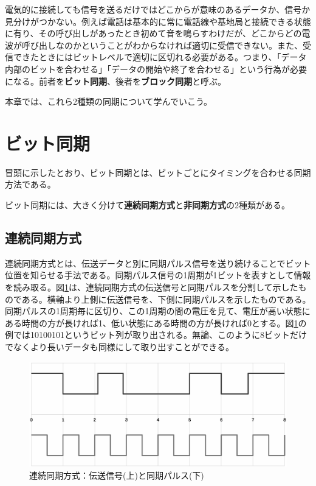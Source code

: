 電気的に接続しても信号を送るだけではどこからが意味のあるデータか、信号か見分けがつかない。例えば電話は基本的に常に電話線や基地局と接続できる状態に有り、その呼び出しがあったとき初めて音を鳴らすわけだが、どこからどの電波が呼び出しなのかということがわからなければ適切に受信できない。また、受信できたときにはビットレベルで適切に区切れる必要がある。つまり、「データ内部のビットを合わせる」「データの開始や終了を合わせる」という行為が必要になる。前者を\textbf{ビット同期}、後者を\textbf{ブロック同期}と呼ぶ。

本章では、これら2種類の同期について学んでいこう。

\section{ビット同期}

冒頭に示したとおり、ビット同期とは、ビットごとにタイミングを合わせる同期方法である。

ビット同期には、大きく分けて\textbf{連続同期方式}と\textbf{非同期方式}の2種類がある。

\subsection{連続同期方式}
連続同期方式とは、伝送データと別に同期パルス信号を送り続けることでビット位置を知らせる手法である。同期パルス信号の1周期が1ビットを表すとして情報を読み取る。図\ref{fig4_1}は、連続同期方式の伝送信号と同期パルスを分割して示したものである。横軸より上側に伝送信号を、下側に同期パルスを示したものである。同期パルスの1周期毎に区切り、この1周期の間の電圧を見て、電圧が高い状態にある時間の方が長ければ1、低い状態にある時間の方が長ければ0とする。図\ref{fig4_1}の例では10100101というビット列が取り出される。無論、このように8ビットだけでなくより長いデータも同様にして取り出すことができる。
\begin{figure}[h]
\centering
\includegraphics[width=0.9\linewidth,keepaspectratio]{fig/fig4_1.eps}
\caption{連続同期方式：伝送信号(上)と同期パルス(下)}\label{fig4_1}
\end{figure}


